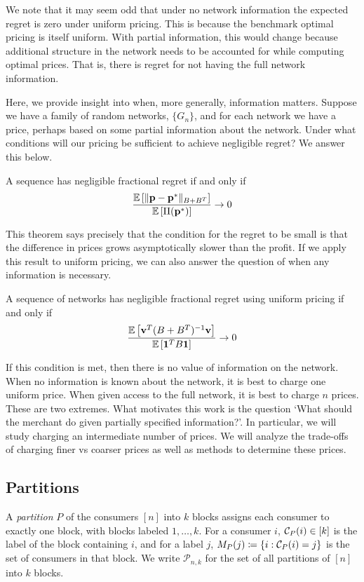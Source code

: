 We note that it may seem odd that under no network information the expected regret is zero under uniform pricing. This is because the benchmark optimal pricing is itself uniform. With partial information, this would change because additional structure in the network needs to be accounted for while computing optimal prices. That is, there is regret for not having the full network information. 


Here, we provide insight into when, more generally, information matters. Suppose we have a family of random networks, $\{G_n\}$, and for each network we have a price, perhaps based on some partial information about the network. Under what conditions will our pricing be sufficient to achieve negligible regret? We answer this below.
\begin{theorem}
    A sequence has negligible fractional regret if and only if \[ \frac{ \mathbb{E}\left[  \| \mathbf{p} - \mathbf{p}^* \|_{B+B^T} \right]  }{ \mathbb{E}\left[ \Pi(\mathbf{p}^*)\right]} \to 0 \]
\end{theorem}

This theorem says precisely that the condition for the regret to be small is that the difference in prices grows asymptotically slower than the profit. If we apply this result to uniform pricing, we can also answer the question of when any information is necessary.

\begin{corollary}
    A sequence of networks has negligible fractional regret using uniform pricing if and only if \[ \frac{\mathbb{E}\left[  \mathbf{v}^T (B+B^T)^{-1} \mathbf{v}\right] }{\mathbb{E}\left[  \mathbf{1}^T B \mathbf{1} \right] } \to 0 \] 
\end{corollary}

If this condition is met, then there is no value of information on the network. When no information is known about the network, it is best to charge one uniform price. When given access to the full network, it is best to charge $n$ prices. These are two extremes. What motivates this work is the question `What should the merchant do given partially specified information?'. In particular, we will study charging an intermediate number of prices. We will analyze the trade-offs of charging finer vs coarser prices as well as methods to determine these prices.

\subsection{Partitions}\label{sec:partitions}

    A \emph{partition} $P$ of the consumers $[n]$ into $k$ blocks assigns each consumer to exactly one block, with blocks labeled $1, \dots, k$. For a consumer $i$, $\mathcal{C}_{P}(i) \in [k]$ is the label of the block containing $i$, and for a label $j$, $M_{P}(j) \coloneqq \{ i : \mathcal{C}_{P}(i) = j \}$ is the set of consumers in that block. We write $\mathcal{P}_{n,k}$ for the set of all partitions of $[n]$ into $k$ blocks.


